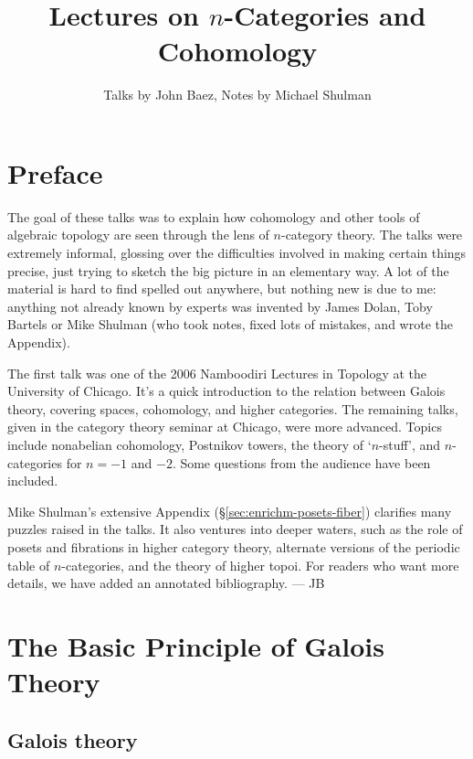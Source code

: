 \documentclass[12pt]{amsart}
\title{Lectures on $n$-Categories and Cohomology}
\author{Talks by John Baez, Notes by Michael Shulman}
\begin{document}
\maketitle

\tableofcontents 

\eject

\section*{Preface}
\label{sec:preface}
The goal of these talks was to explain how cohomology and other
tools of algebraic topology are seen through the lens of 
$n$-category theory.  
The talks were extremely informal, glossing over the difficulties
involved in making certain things precise, just trying to sketch the
big picture in an elementary way.  A lot of the material is
hard to find spelled out anywhere, but nothing new is due to me:
anything not already known by experts was invented by James Dolan,
Toby Bartels or Mike Shulman (who took notes, fixed lots of mistakes,
and wrote the Appendix).

The first talk was one of the 2006 Namboodiri Lectures
in Topology at the University of Chicago.
It's a quick introduction to the relation 
between Galois theory, covering spaces, cohomology, and higher 
categories.  The remaining talks, given in the category theory 
seminar at Chicago, were more advanced.
Topics include nonabelian cohomology, Postnikov towers, the 
theory of `$n$-stuff', and $n$-categories for $n = -1$ and $-2$.
Some questions from the audience have been included.  

Mike Shulman's extensive Appendix (\S\ref{sec:enrichm-posets-fiber})
clarifies many puzzles raised in
the talks.  It also ventures into deeper waters, such as the role of posets
and fibrations in higher category theory, alternate versions of the 
periodic table of $n$-categories, and the theory of higher topoi.
For readers who want more details, we have added an annotated
bibliography. --- JB

\vfill
\eject

\section{The Basic Principle of Galois Theory}
\label{sec:basic-principle-galois}

\subsection{Galois theory}
\label{sec:galois-erlangen}
\end{document}
